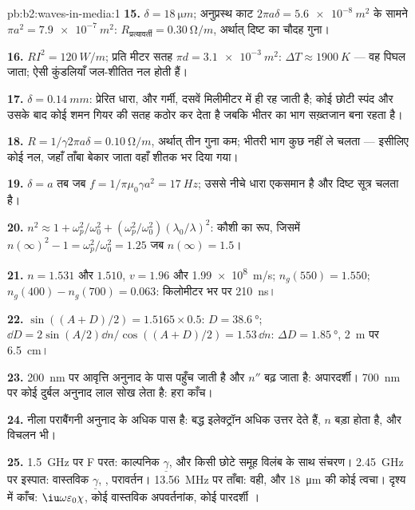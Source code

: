 \begin{solution}{pb:b2:waves-in-media:1}
\textbf{15.} $\delta = \qty{18}{\micro m}$; अनुप्रस्थ काट $2\pi a\delta = \qty{5.6e-8}{m^2}$ के सामने
$\pi a^2 = \qty{7.9e-7}{m^2}$: $R_{\text{प्रत्यावर्ती}} = \qty{0.30}{\ohm/m}$, अर्थात् दिष्ट का चौदह गुना।

\textbf{16.} $RI^2 = \qty{120}{W/m}$; प्रति मीटर सतह $\pi d = \qty{3.1e-3}{m^2}$:
$\Delta T \approx \qty{1900}{K}$ --- वह पिघल जाता; ऐसी कुंडलियाँ जल-शीतित नल होती हैं।

\textbf{17.} $\delta = \qty{0.14}{mm}$: प्रेरित धारा, और गर्मी, दसवें
मिलीमीटर में ही रह जाती है; कोई छोटी स्पंद और उसके बाद कोई शमन गियर की
सतह कठोर कर देता है जबकि भीतर का भाग सख़्तजान बना रहता है।

\textbf{18.} $R = 1/\gamma2\pi a\delta = \qty{0.10}{\ohm/m}$, अर्थात् तीन गुना कम; भीतरी
भाग कुछ नहीं ले चलता --- इसीलिए कोई नल, जहाँ ताँबा बेकार जाता वहाँ
शीतक भर दिया गया।

\textbf{19.} $\delta = a$ तब जब $f = 1/\pi\mu_0\gamma a^2 = \qty{17}{Hz}$; उससे नीचे धारा
एकसमान है और दिष्ट सूत्र चलता है।

\textbf{20.} $n^2 \approx 1 + \omega_p^2/\omega_0^2 + (\omega_p^2/\omega_0^2)(\lambda_0/\lambda)^2$: कौशी का रूप,
जिसमें $n(\infty)^2 - 1 = \omega_p^2/\omega_0^2 = 1.25$ जब $n(\infty) = 1.5$।

\textbf{21.} $n = 1.531$ और $1.510$, $v = 1.96$ और \qty{1.99e8}{m/s}; $n_g(550) =
1.550$; $n_g(400) - n_g(700) = 0.063$: किलोमीटर भर पर \qty{210}{ns}।

\textbf{22.} $\sin((A + D)/2) = 1.5165 \times 0.5$: $D = \qty{38.6}{\degree}$; $\dd D = 2\sin
(A/2)\dd n/\cos((A + D)/2) = 1.53\,\dd n$: $\Delta D = \qty{1.85}{\degree}$, \qty{2}{m} पर \qty{6.5}{cm}।

\textbf{23.} \qty{200}{nm} पर आवृत्ति अनुनाद के पास पहुँच जाती है और
$n''$ बढ़ जाता है: अपारदर्शी। \qty{700}{nm} पर कोई दुर्बल अनुनाद लाल सोख लेता है:
हरा काँच।

\textbf{24.} नीला पराबैंगनी अनुनाद के अधिक पास है: बद्ध
इलेक्ट्रॉन अधिक उत्तर देते हैं, $n$ बड़ा होता है, और विचलन भी।

\textbf{25.} \qty{1.5}{GHz} पर F परत: काल्पनिक $\underline\gamma$, और किसी छोटे
समूह विलंब के साथ संचरण। \qty{2.45}{GHz} पर इस्पात: वास्तविक $\underline\gamma$, , परावर्तन। \qty{13.56}{MHz} पर ताँबा: वही, और \qty{18}{\micro m} की
कोई त्वचा। दृश्य में काँच: $\iu\omega\varepsilon_0\chi$, कोई वास्तविक अपवर्तनांक, कोई
पारदर्शी ।
\end{solution}
